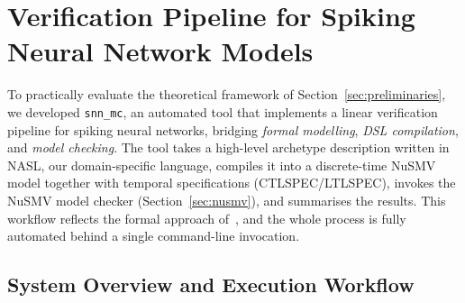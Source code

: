 \documentclass[
]{ceurart}
\begin{document}
\section{Verification Pipeline for Spiking Neural Network Models}
\label{sec:pipeline}

To practically evaluate the theoretical framework of
Section~\ref{sec:preliminaries}, we developed \texttt{snn\_mc}, an automated
tool that implements a linear verification pipeline for spiking neural
networks, bridging \emph{formal modelling}, \emph{DSL compilation}, and
\emph{model checking}. The tool takes a high-level archetype description
written in \textsc{NASL}, our domain-specific language, compiles it into a
discrete-time NuSMV model together with temporal specifications
(CTLSPEC/LTLSPEC), invokes the NuSMV model checker
(Section~\ref{sec:nusmv}), and summarises the results. This workflow
reflects the formal approach of~\cite{DeMaria2020,DeMaria2016,DeMaria2017},
and the whole process is fully automated behind a single command-line
invocation.

\subsection{System Overview and Execution Workflow}
\label{sec:overview}
\end{document}

